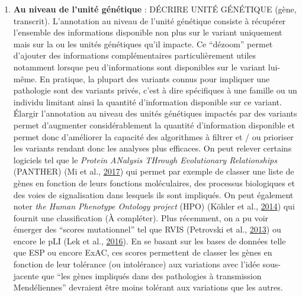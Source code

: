 \documentclass[12pt,twoside]{reedthesis}
\providecommand{\tightlist}{%
  \setlength{\itemsep}{0pt}\setlength{\parskip}{0pt}}
\theoremstyle{definition}
\theoremstyle{definition}
\theoremstyle{remark}
\begin{document}
  \newpage
  
  \begin{enumerate}
  \def\labelenumi{\arabic{enumi}.}
  \setcounter{enumi}{1}
  \tightlist
  \item
    \textbf{Au niveau de l'unité génétique} : DÉCRIRE UNITÉ GÉNÉTIQUE
    (gène, transcrit). L'annotation au niveau de l'unité génétique
    consiste à récupérer l'ensemble des informations disponible non plus
    sur le variant uniquement mais sur la ou les unités génétiques qu'il
    impacte. Ce ``dézoom'' permet d'ajouter des informations
    complémentaires particulièrement utiles notamment lorsque peu
    d'informations sont disponibles sur le variant lui-même. En pratique,
    la plupart des variants connus pour impliquer une pathologie sont des
    variants privés, c'est à dire spécifiques à une famille ou un individu
    limitant ainsi la quantité d'information disponible sur ce variant.
    Élargir l'annotation au niveau des unités génétiques impactés par des
    variants permet d'augmenter considérablement la quantité d'information
    disponible et permet donc d'améliorer la capacité des algorithmes à
    filtrer et / ou prioriser les variants rendant donc les analyses plus
    efficaces. On peut relever certains logiciels tel que le \emph{Protein
    ANalysis THrough Evolutionary Relationships} (PANTHER) (Mi et al.,
    \protect\hyperlink{ref-Mi2017}{2017}) qui permet par exemple de
    classer une liste de gènes en fonction de leurs fonctions
    moléculaires, des processus biologiques et des voies de signalisation
    dans lesquels ils sont impliqués. On peut également noter \emph{the
    Human Phenotype Ontology project} (HPO) (Köhler et al.,
    \protect\hyperlink{ref-Kohler2014}{2014}) qui fournit une
    classification (À compléter). Plus récemment, on a pu voir émerger des
    ``scores mutationnel'' tel que RVIS (Petrovski et al.,
    \protect\hyperlink{ref-Petrovski2013}{2013}) ou encore le pLI (Lek et
    al., \protect\hyperlink{ref-Lek2016}{2016}). En se basant sur les
    bases de données telle que ESP ou encore ExAC, ces scores permettent
    de classer les gènes en fonction de leur tolérance (ou intolérance)
    aux variations avec l'idée sous-jacente que ``les gènes impliqués dans
    des pathologies à transmission Mendéliennes'' devraient être moins
    tolérant aux variations que les autres.
  \end{enumerate}
  
\end{document}
